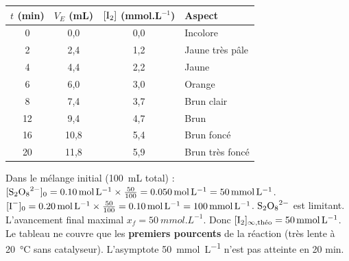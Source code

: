 \documentclass[11pt]{article}
\begin{document}
\begin{center}
\begin{tabularx}{\linewidth}{|c|c|c|X|}
\hline
\rowcolor{popgreen!60} $t$ (min) & $V_E$ (mL) & $[\ce{I2}]$ (mmol.L$^{-1}$) & Aspect \\
\hline
\rowcolor{popgreenL} 0 & 0,0 & 0,0 & Incolore \\
\hline
2 & 2,4 & 1,2 & Jaune très pâle \\
\hline
\rowcolor{popgreenL} 4 & 4,4 & 2,2 & Jaune \\
\hline
6 & 6,0 & 3,0 & Orange \\
\hline
\rowcolor{popgreenL} 8 & 7,4 & 3,7 & Brun clair \\
\hline
12 & 9,4 & 4,7 & Brun \\
\hline
\rowcolor{popgreenL} 16 & 10,8 & 5,4 & Brun foncé \\
\hline
20 & 11,8 & 5,9 & Brun très foncé \\
\hline
\end{tabularx}
\end{center}

\begin{aretenir}
Dans le mélange initial (\SI{100}{mL} total) :
$[\ce{S2O8^2-}]_0 = \SI{0,10}{mol.L^{-1}} \times \frac{50}{100} = \SI{0,050}{mol.L^{-1}} = \SI{50}{mmol.L^{-1}}$.
$[\ce{I-}]_0 = \SI{0,20}{mol.L^{-1}} \times \frac{50}{100} = \SI{0,10}{mol.L^{-1}} = \SI{100}{mmol.L^{-1}}$.
$\ce{S2O8^2-}$ est limitant. L'avancement final maximal $x_f = \SI{50}{mmol.L^{-1}}$.
Donc $[\ce{I2}]_{\infty, \text{théo}} = \SI{50}{mmol.L^{-1}}$.
Le tableau ne couvre que les \textbf{premiers pourcents} de la réaction (très lente à \SI{20}{\celsius} sans catalyseur). L'asymptote \SI{50}{mmol.L^{-1}} n'est pas atteinte en 20 min.
\end{aretenir}
\end{document}
